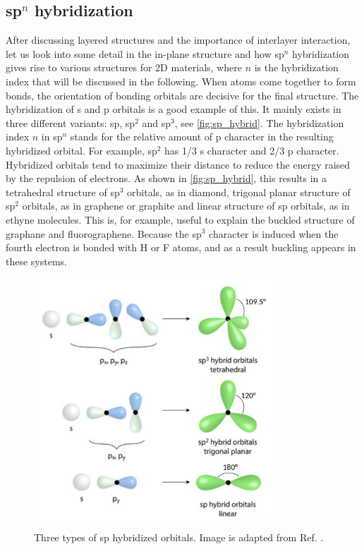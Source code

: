 \subsection{sp$^n$ hybridization\label{sphyb}}

After discussing layered structures and the importance of interlayer interaction, let us look into some detail in the in-plane structure and how sp$^n$ hybridization gives rise to various structures for 2D materials, where $n$ is the hybridization index that will be discussed in the following. When atoms come together to form bonds, the orientation of bonding orbitals are decisive for the final structure. The hybridization of s and p orbitals is a good example of this.  It mainly exists in three different variants: sp, sp$^2$ and sp$^3$, see \autoref{fig:sp_hybrid}. The hybridization index $n$ in sp$^n$ stands for the relative amount of p character in the resulting hybridized orbital. For example, sp$^2$ has 1/3 s character and 2/3 p character. Hybridized orbitals tend to maximize their distance to reduce the energy raised by the repulsion of electrons. As shown in \autoref{fig:sp_hybrid}, this results in a tetrahedral structure of sp$^3$ orbitals, as in diamond, trigonal planar structure of sp$^2$ orbitals, as in graphene or graphite and linear structure of sp orbitals, as in ethyne molecules.  This is, for example, useful to explain the buckled structure of graphane and fluorographene. Because the sp$^3$ character is induced when the fourth electron is bonded with H or F atoms, and as a result buckling appears in these systems. 

\begin{figure}[htb] 
\centering  
\includegraphics[width=0.8\textwidth]{sp_hybrid.png}
\caption[Three types of sp hybridized orbitals]{ Three types of sp hybridized orbitals. Image is adapted from Ref. \cite{sp_hybrid}. }  
\label{fig:sp_hybrid}
\end{figure} 

